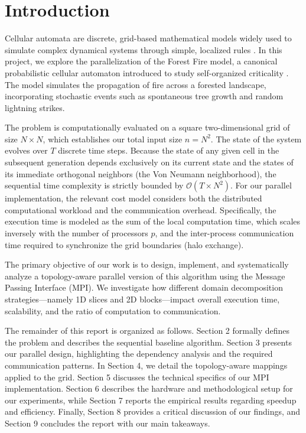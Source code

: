 \section{Introduction}

Cellular automata are discrete, grid-based mathematical models widely used to simulate complex dynamical systems through simple, localized rules \cite{cormen}. In this project, we explore the parallelization of the Forest Fire model, a canonical probabilistic cellular automaton introduced to study self-organized criticality \cite{drossel1992}. The model simulates the propagation of fire across a forested landscape, incorporating stochastic events such as spontaneous tree growth and random lightning strikes. 

The problem is computationally evaluated on a square two-dimensional grid of size $N \times N$, which establishes our total input size $n = N^2$. The state of the system evolves over $T$ discrete time steps. Because the state of any given cell in the subsequent generation depends exclusively on its current state and the states of its immediate orthogonal neighbors (the Von Neumann neighborhood), the sequential time complexity is strictly bounded by $\mathcal{O}(T \times N^2)$. For our parallel implementation, the relevant cost model considers both the distributed computational workload and the communication overhead. Specifically, the execution time is modeled as the sum of the local computation time, which scales inversely with the number of processors $p$, and the inter-process communication time required to synchronize the grid boundaries (halo exchange).

The primary objective of our work is to design, implement, and systematically analyze a topology-aware parallel version of this algorithm using the Message Passing Interface (MPI). We investigate how different domain decomposition strategies—namely 1D slices and 2D blocks—impact overall execution time, scalability, and the ratio of computation to communication.

The remainder of this report is organized as follows. Section 2 formally defines the problem and describes the sequential baseline algorithm. Section 3 presents our parallel design, highlighting the dependency analysis and the required communication patterns. In Section 4, we detail the topology-aware mappings applied to the grid. Section 5 discusses the technical specifics of our MPI implementation. Section 6 describes the hardware and methodological setup for our experiments, while Section 7 reports the empirical results regarding speedup and efficiency. Finally, Section 8 provides a critical discussion of our findings, and Section 9 concludes the report with our main takeaways.